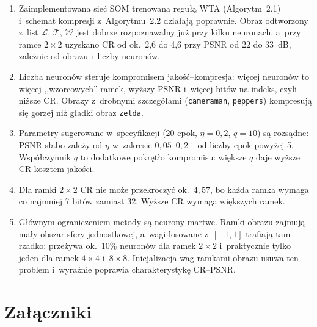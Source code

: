 \documentclass[12pt]{article}
\begin{document}
\begin{enumerate}
 \item Zaimplementowana sieć SOM trenowana regułą WTA (Algorytm~2.1) i~schemat kompresji
       z~Algorytmu~2.2 działają poprawnie. Obraz odtworzony z~list $\mathcal{L}$, $\mathcal{T}$,
       $\mathcal{W}$ jest dobrze rozpoznawalny już przy kilku neuronach, a~przy ramce $2\times2$ uzyskano
       CR od ok.\ 2,6 do 4,6 przy PSNR od 22 do 33~dB, zależnie od obrazu i~liczby neuronów.
 \item Liczba neuronów steruje kompromisem jakość--kompresja: więcej neuronów to więcej ,,wzorcowych''
       ramek, wyższy PSNR i~więcej bitów na indeks, czyli niższe CR. Obrazy z~drobnymi szczegółami
       (\texttt{cameraman}, \texttt{peppers}) kompresują się gorzej niż gładki obraz \texttt{zelda}.
 \item Parametry sugerowane w~specyfikacji (20 epok, $\eta=0{,}2$, $q=10$) są rozsądne: PSNR słabo zależy
       od $\eta$ w~zakresie $0{,}05$--$0{,}2$ i~od liczby epok powyżej 5. Współczynnik $q$ to dodatkowe
       pokrętło kompromisu: większe $q$ daje wyższe CR kosztem jakości.
 \item Dla ramki $2\times2$ CR nie może przekroczyć ok.\ $4{,}57$, bo każda ramka wymaga co najmniej
       7 bitów zamiast 32. Wyższe CR wymaga większych ramek.
 \item Głównym ograniczeniem metody są neurony martwe. Ramki obrazu zajmują mały obszar sfery
       jednostkowej, a~wagi losowane z~$[-1,1]$ trafiają tam rzadko: przeżywa ok.\ 10\% neuronów
       dla ramek $2\times2$ i~praktycznie tylko jeden dla ramek $4\times4$ i~$8\times8$. Inicjalizacja
       wag ramkami obrazu usuwa ten problem i~wyraźnie poprawia charakterystykę CR--PSNR.
\end{enumerate}


\section{Załączniki}
\end{document}
